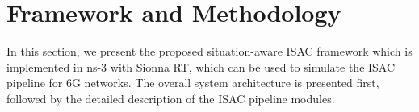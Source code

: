 \section{Framework and Methodology}
\label{sec:methodology}

In this section, we present the proposed situation-aware ISAC framework which is implemented in ns-3 with Sionna RT, which can be used to simulate the ISAC pipeline for 6G networks.
The overall system architecture is presented first, followed by the detailed description of the ISAC pipeline modules.







